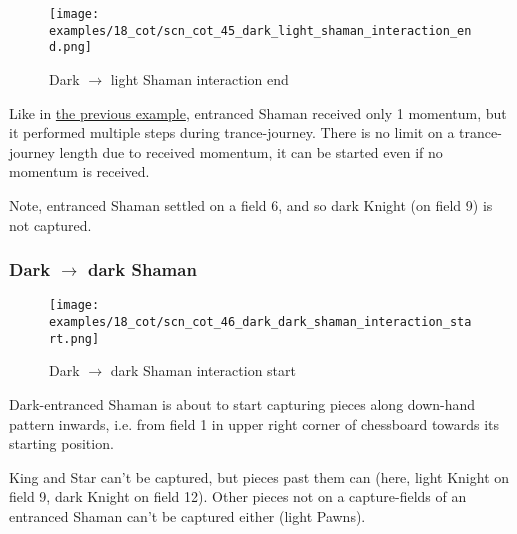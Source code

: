 \clearpage %

\noindent
\begin{figure}[!h]
\texttt{[image: examples/18\_cot/scn\_cot\_45\_dark\_light\_shaman\_interaction\_end.png]}
\caption{Dark $\rightarrow$ light Shaman interaction end}
\label{fig:scn_cot_45_dark_light_shaman_interaction_end}
\end{figure}

Like in
\hyperref[fig:scn_cot_42_light_light_shaman_interaction_start]{the previous example},
entranced Shaman received only 1 momentum, but it performed multiple steps during
trance-journey. There is no limit on a trance-journey length due to received momentum,
it can be started even if no momentum is received.

Note, entranced Shaman settled on a field 6, and so dark Knight (on field 9) is not
captured.

\clearpage %

\subsubsection*{Dark $\rightarrow$ dark Shaman}
\label{sec:Conquest of Tlalocan/Trance-journey/Interactions/Dark --> dark Shaman}

\vspace*{-1.5\baselineskip}
\noindent
\begin{figure}[!h]
\texttt{[image: examples/18\_cot/scn\_cot\_46\_dark\_dark\_shaman\_interaction\_start.png]}
\vspace*{-1.4\baselineskip}
\caption{Dark $\rightarrow$ dark Shaman interaction start}
\label{fig:scn_cot_46_dark_dark_shaman_interaction_start}
\end{figure}

\vspace*{-0.5\baselineskip}
Dark-entranced Shaman is about to start capturing pieces along down-hand pattern
inwards, i.e. from field 1 in upper right corner of chessboard towards its starting
position.

King and Star can't be captured, but pieces past them can (here, light Knight on
field 9, dark Knight on field 12). Other pieces not on a capture-fields of an
entranced Shaman can't be captured either (light Pawns).

